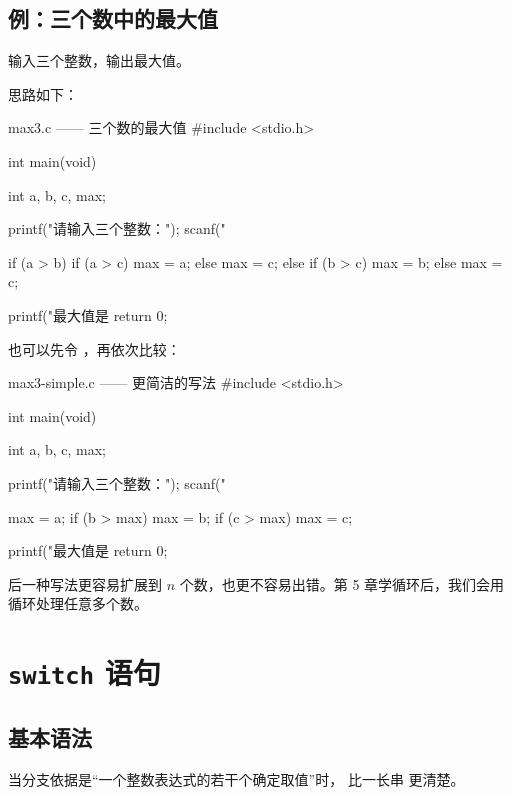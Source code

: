 \subsection{例：三个数中的最大值}

\begin{example}
输入三个整数，输出最大值。
\end{example}
\begin{solution}
思路如下：

\begin{codebox}{max3.c —— 三个数的最大值}
#include <stdio.h>

int main(void)
{
    int a, b, c, max;

    printf("请输入三个整数：");
    scanf("%

    if (a > b) {
        if (a > c) {
            max = a;
        } else {
            max = c;
        }
    } else {
        if (b > c) {
            max = b;
        } else {
            max = c;
        }
    }

    printf("最大值是 %
    return 0;
}
\end{codebox}

也可以先令 ，再依次比较：
\begin{codebox}{max3-simple.c —— 更简洁的写法}
#include <stdio.h>

int main(void)
{
    int a, b, c, max;

    printf("请输入三个整数：");
    scanf("%

    max = a;
    if (b > max) {
        max = b;
    }
    if (c > max) {
        max = c;
    }

    printf("最大值是 %
    return 0;
}
\end{codebox}
后一种写法更容易扩展到 $n$ 个数，也更不容易出错。第 5 章学循环后，我们会用循环处理任意多个数。
\end{solution}

\section{\texttt{switch} 语句}

\subsection{基本语法}

当分支依据是“一个整数表达式的若干个确定取值”时， 比一长串  更清楚。

